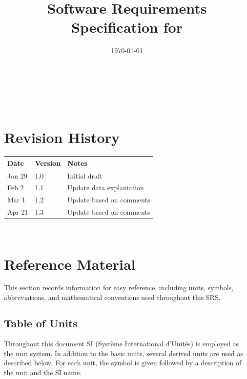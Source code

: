 \documentclass[12pt]{article}
\begin{document}
\title{Software Requirements Specification for \progname} 
\author{\authname}
\date{\today}
	
\maketitle

~\newpage


\tableofcontents

~\newpage

\section*{Revision History}

\begin{tabularx}{\textwidth}{p{3cm}p{2cm}X}
\toprule {\bf Date} & {\bf Version} & {\bf Notes}\\
\midrule
Jan 29 & 1.0 & Initial draft\\
Feb 2 & 1.1 & Update data explaniation\\
Mar 1 & 1.2 & Update based on comments \\
Apr 21 & 1.3 & Update based on comments \\
\bottomrule
\end{tabularx}


~\newpage

\section{Reference Material}

This section records information for easy reference, including units, symbols, abbreviations, and mathematical conventions used throughout this SRS.

\subsection{Table of Units}

Throughout this document SI (Syst\`{e}me International d'Unit\'{e}s) is employed
as the unit system.  In addition to the basic units, several derived units are
used as described below.  For each unit, the symbol is given followed by a
description of the unit and the SI name.
~\newline
\end{document}
